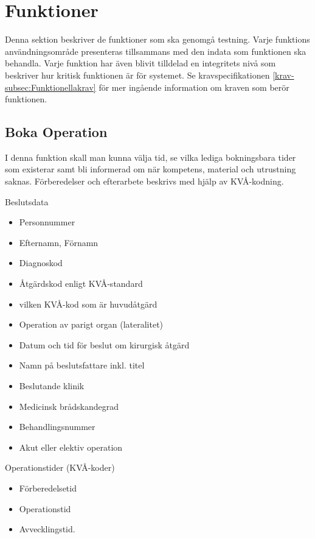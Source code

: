 \documentclass[a4paper,10pt, twoside]{article}
\begin{document}
\section{Funktioner}
Denna sektion beskriver de funktioner som ska genomgå testning. Varje funktions användningsområde presenteras tillsammans med den indata som funktionen ska behandla. Varje funktion har även blivit tilldelad en integritets nivå som
beskriver hur kritisk funktionen är för systemet. Se kravspecifikationen \ref{krav-subsec:Funktionellakrav} för mer ingående information om kraven som berör funktionen.

\subsection{Boka Operation}
\label{sec:Boka Operation}

I denna funktion skall man kunna välja tid, se vilka lediga bokningsbara tider som existerar samt bli informerad om när kompetens, material och utrustning saknas. Förberedelser och efterarbete beskrivs med hjälp av KVÅ-kodning.

Beslutsdata
\begin{multicols}{3}
\begin{itemize}
	\item Personnummer
	\item Efternamn, Förnamn
	\item Diagnoskod
	\item Åtgärdskod enligt KVÅ-standard
	\item vilken KVÅ-kod som är huvudåtgärd
	\item Operation av parigt organ (lateralitet)
	\item Datum och tid för beslut om kirurgisk åtgärd
	\item Namn på beslutsfattare inkl. titel
	\item Beslutande klinik
	\item Medicinsk brådskandegrad
	\item Behandlingsnummer
	\item Akut eller elektiv operation
\end{itemize}
\end{multicols}

Operationstider (KVÅ-koder)
\begin{multicols}{3}
\begin{itemize}
	\item Förberedelsetid
	\item Operationstid
	\item Avvecklingstid.
\end{itemize}
\end{multicols}
\end{document}
